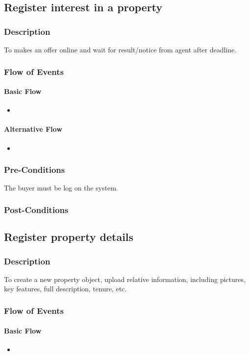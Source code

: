 \documentclass[a4paper,12pt]{article}
\begin{document}
\subsection{Register interest in a property}
\subsubsection{Description}
To makes an offer online and wait for result/notice from agent after deadline.
\subsubsection{Flow of Events}
\paragraph{Basic Flow}
\begin{itemize}
\item
\end{itemize}
\paragraph{Alternative Flow}
\begin{itemize}
\item
\end{itemize}
\subsubsection{Pre-Conditions}
The buyer must be log on the system.
\subsubsection{Post-Conditions}

\subsection{Register property details}
\subsubsection{Description}
To create a new property object, upload relative information, including pictures, key features, full description, tenure, etc.
\subsubsection{Flow of Events}
\paragraph{Basic Flow}
\begin{itemize}
\item
\end{itemize}
\end{document}
